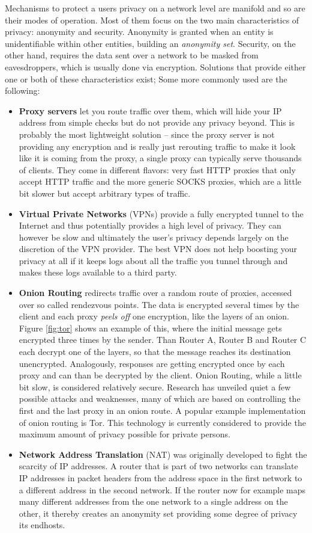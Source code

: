 \documentclass{acm_proc_article-sp}
\begin{document}
Mechanisms to protect a users privacy on a network level are manifold and so are their modes of operation. Most of them focus on the two main characteristics of privacy: anonymity and security. Anonymity is granted when an entity is unidentifiable within other entities, building an \emph{anonymity set}. Security, on the other hand, requires the data sent over a network to be masked from eavesdroppers, which is usually done via encryption. Solutions that provide either one or both of these characteristics exist; Some more commonly used are the following:

\begin{itemize}
\item \textbf{Proxy servers} let you route traffic over them, which will hide your IP address from simple checks but do not provide any privacy beyond. This is probably the most lightweight solution -- since the proxy server is not providing any encryption and is really just rerouting traffic to make it look like it is coming from the proxy, a single proxy can typically serve thousands of clients. They come in different flavors: very fast HTTP proxies that only accept HTTP traffic and the more generic SOCKS proxies, which are a little bit slower but accept arbitrary types of traffic.
\item \textbf{Virtual Private Networks} (VPNs) provide a fully encrypted tunnel to the Internet and thus potentially provides a high level of privacy. They can however be slow and ultimately the user's privacy depends largely on the discretion of the VPN provider. The best VPN does not help boosting your privacy at all if it keeps logs about all the traffic you tunnel through and makes these logs available to a third party. 
\item \textbf{Onion Routing} redirects traffic over a random route of proxies, accessed over so called rendezvous points. The data is encrypted several times by the client and each proxy \emph{peels off} one encryption, like the layers of an onion. Figure \ref{fig:tor} shows an example of this, where the initial message gets encrypted three times by the sender. Than Router A, Router B and Router C each decrypt one of the layers, so that the message reaches its destination unencrypted. Analogously, responses are getting encrypted once by each proxy and can than be decrypted by the client. Onion Routing, while a little bit slow, is considered relatively secure. Research has unveiled quiet a few possible attacks and weaknesses, many of which are based on controlling the first and the last proxy in an onion route. A popular example implementation of onion routing is Tor. This technology is currently considered to provide the maximum amount of privacy possible for private persons.
\item \textbf{Network Address Translation} (NAT) was originally developed to fight the scarcity of IP addresses. A router that is part of two networks can translate IP addresses in packet headers from the address space in the first network to a different address in the second network. If the router now for example maps many different addresses from the one network to a single address on the other, it thereby creates an anonymity set providing some degree of privacy its endhosts.
\end{itemize}
\end{document}
